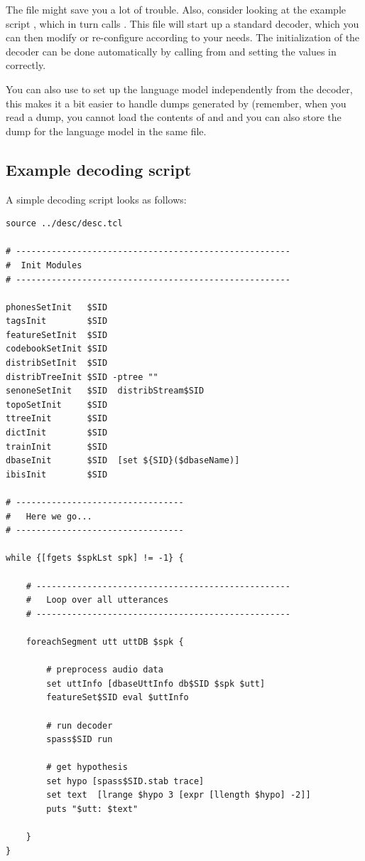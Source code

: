 The file  might save you a lot  of trouble.  Also,
consider looking at the example script , which
in  turn  calls .    This file will   start up a
standard decoder, which you  can then modify or re-configure according
to your   needs.   The initialization of  the    decoder can  be  done
automatically      by        calling         from
  and  setting the values in 
correctly.

You can  also use   to set  up the  language model
independently from the decoder, this  makes it a  bit easier to handle
dumps generated by    (remember,
when  you  read   a  dump,   you    cannot   load  the contents     of
  and   and you can also
store the dump for the language model in the same file.


\subsection{Example decoding script}

A simple decoding script looks as follows:

\begin{verbatim}
source ../desc/desc.tcl

# ------------------------------------------------------
#  Init Modules
# ------------------------------------------------------

phonesSetInit   $SID
tagsInit        $SID
featureSetInit  $SID
codebookSetInit $SID
distribSetInit  $SID
distribTreeInit $SID -ptree ""
senoneSetInit   $SID  distribStream$SID
topoSetInit     $SID
ttreeInit       $SID
dictInit        $SID
trainInit       $SID
dbaseInit       $SID  [set ${SID}($dbaseName)]
ibisInit        $SID

# ---------------------------------
#   Here we go...
# ---------------------------------

while {[fgets $spkLst spk] != -1} {

    # --------------------------------------------------
    #   Loop over all utterances
    # --------------------------------------------------

    foreachSegment utt uttDB $spk {

        # preprocess audio data
        set uttInfo [dbaseUttInfo db$SID $spk $utt]
        featureSet$SID eval $uttInfo

        # run decoder
        spass$SID run

        # get hypothesis
        set hypo [spass$SID.stab trace]
        set text  [lrange $hypo 3 [expr [llength $hypo] -2]]
        puts "$utt: $text"

    }
}
\end{verbatim}

